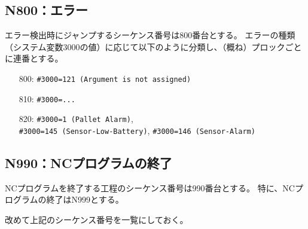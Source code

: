 \subsection{N800：エラー\label{subsec:sequenceNerror}\TBW}
エラー検出時にジャンプするシーケンス番号は800番台とする。
エラーの種類（システム変数\ttNum3000の値）に応じて以下のように分類し、（概ね）プロックごとに連番とする。
\begin{enumerate}
\item[800:] \verb|#3000=121 (Argument is not assigned)|
\item[810:] \verb|#3000=...|
\item[820:] \verb|#3000=1 (Pallet Alarm)|,\\
            \verb|#3000=145 (Sensor-Low-Battery)|, \verb|#3000=146 (Sensor-Alarm)|
\end{enumerate}


\subsection{N990：NCプログラムの終了\label{subsec:sequenceNprgEnd}}
NCプログラムを終了する工程のシーケンス番号は990番台とする。
特に、NCプログラムの終了はN999とする。



\clearpage
\noindent
改めて上記のシーケンス番号を一覧にしておく。\\

